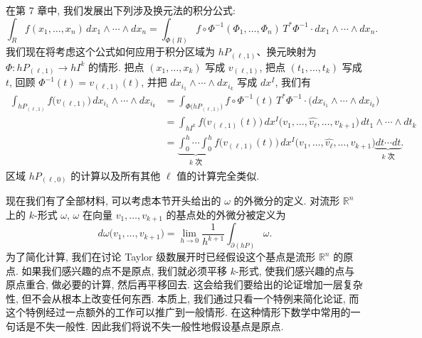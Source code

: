 在第 7 章中, 我们发展出下列涉及换元法的积分公式: 
\[
\int_{R}f(x_1,\ldots,x_n)\,dx_1\wedge\cdots\wedge dx_n
=\int_{\Phi(R)}f\circ\Phi^{-1}(\Phi_1,\ldots,\Phi_n)\,T^*\Phi^{-1}\cdot dx_1\wedge\cdots\wedge dx_n.
\]
我们现在将考虑这个公式如何应用于积分区域为 $hP_{(\ell,1)}$、换元映射为 $\Phi:hP_{(\ell,1)}\to hI^k$ 的情形. 把点 $(x_1,\ldots,x_k)$ 写成 $v_{(\ell,1)}$, 把点 $(t_1,\ldots,t_k)$ 写成 $t$, 回顾 $\Phi^{-1}(t)=v_{(\ell,1)}(t)$, 并把 $dx_{i_1}\wedge\cdots\wedge dx_{i_k}$ 写成 $dx^I$, 我们有
\begin{align*}
\int_{hP_{(\ell,1)}}f\bigl(v_{(\ell,1)}\bigr)\,dx_{i_1}\wedge\cdots\wedge dx_{i_k}
&=\int_{\Phi\bigl(hP_{(\ell,1)}\bigr)}f\circ\Phi^{-1}(t)\,T^*\Phi^{-1}\cdot\bigl(dx_{i_1}\wedge\cdots\wedge dx_{i_k}\bigr)\\
&=\int_{hI^k}f\bigl(v_{(\ell,1)}(t)\bigr)\,dx^I\bigl(v_1,\ldots,\widehat{v_\ell},\ldots,v_{k+1}\bigr)\,dt_1\wedge\cdots\wedge dt_k\\
&=\underbrace{\int_0^h\cdots\int_0^h}_{k\text{ 次}}
f\bigl(v_{(\ell,1)}(t)\bigr)\,dx^I\bigl(v_1,\ldots,\widehat{v_\ell},\ldots,v_{k+1}\bigr)\!\underbrace{dt\cdots dt}_{k\text{ 次}}.
\end{align*}
区域 $hP_{(\ell,0)}$ 的计算以及所有其他 $\ell$ 值的计算完全类似.

现在我们有了全部材料, 可以考虑本节开头给出的 $\omega$ 的外微分的定义. 对流形 $\mathbb{R}^n$ 上的 $k$-形式 $\omega$, $\omega$ 在向量 $v_1,\ldots,v_{k+1}$ 的基点处的外微分被定义为
\[
d\omega\bigl(v_1,\ldots,v_{k+1}\bigr)=\lim_{h\to 0}\frac{1}{h^{k+1}}\int_{\partial(hP)}\omega.
\]
为了简化计算, 我们在讨论 Taylor 级数展开时已经假设这个基点是流形 $\mathbb{R}^n$ 的原点. 如果我们感兴趣的点不是原点, 我们就必须平移 $k$-形式, 使我们感兴趣的点与原点重合, 做必要的计算, 然后再平移回去. 这会给我们要给出的论证增加一层复杂性, 但不会从根本上改变任何东西. 本质上, 我们通过只看一个特例来简化论证, 而这个特例经过一点额外的工作可以推广到一般情形. 在这种情形下数学中常用的一句话是不失一般性. 因此我们将说不失一般性地假设基点是原点.

